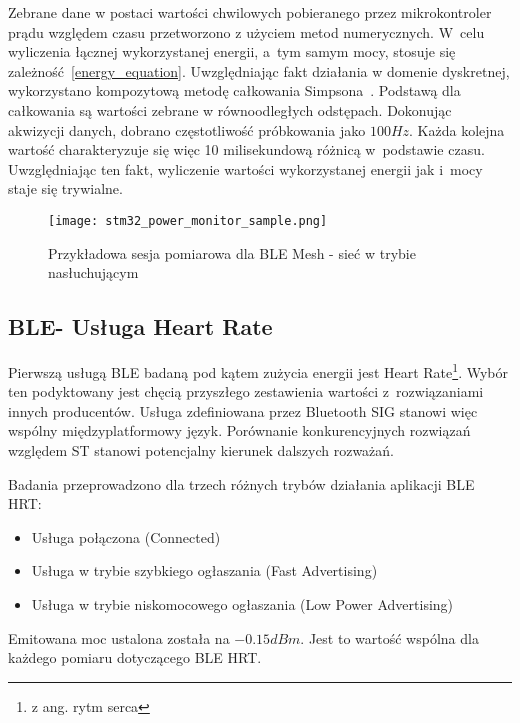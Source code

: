 Zebrane dane w postaci wartości chwilowych pobieranego przez mikrokontroler prądu względem czasu
przetworzono z użyciem metod numerycznych. W~celu wyliczenia łącznej wykorzystanej energii, a~tym samym
mocy, stosuje się zależność~\ref{energy_equation}. Uwzględniając fakt działania w domenie dyskretnej,
wykorzystano kompozytową metodę całkowania Simpsona~\cite{noauthor_scipyintegratesimpson_nodate}.
Podstawą dla całkowania są wartości zebrane w równoodległych odstępach. Dokonując akwizycji danych,
dobrano częstotliwość próbkowania jako $100Hz$. Każda kolejna wartość charakteryzuje się więc
10 milisekundową różnicą w~podstawie czasu. Uwzględniając ten fakt, wyliczenie wartości
wykorzystanej energii jak i~mocy staje się trywialne.

\begin{figure}[!ht]
	\centering \texttt{[image: stm32\_power\_monitor\_sample.png]}
	\caption{Przykładowa sesja pomiarowa dla BLE Mesh - sieć w trybie nasłuchującym}
	\label{rys:measurement_session_sample}
\end{figure}


\subsection{BLE- Usługa Heart Rate}

Pierwszą usługą BLE badaną pod kątem zużycia energii jest Heart Rate\footnote{z ang. rytm serca}. Wybór
ten podyktowany jest chęcią przyszłego zestawienia wartości z~rozwiązaniami innych producentów.
Usługa zdefiniowana przez Bluetooth SIG stanowi więc wspólny międzyplatformowy język.
Porównanie konkurencyjnych rozwiązań względem ST stanowi potencjalny kierunek dalszych rozważań.

Badania przeprowadzono dla trzech różnych trybów działania aplikacji BLE HRT:
\begin{itemize}
\item Usługa połączona (Connected)
\item Usługa w trybie szybkiego ogłaszania (Fast Advertising)
\item Usługa w trybie niskomocowego ogłaszania (Low Power Advertising)
\end{itemize}

Emitowana moc ustalona została na $-0.15dBm$. Jest to wartość wspólna dla każdego pomiaru
dotyczącego BLE HRT.

